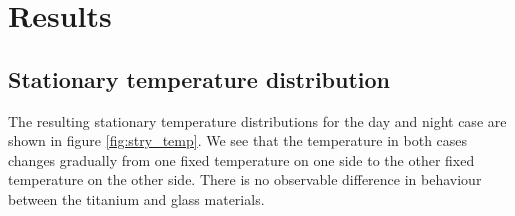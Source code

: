 \documentclass[a4paper,11pt]{article}
\begin{document}
\section{Results}

\subsection{Stationary temperature distribution}
The resulting stationary temperature distributions for the day and night case are shown in figure \ref{fig:stry_temp}. We see that the temperature in both cases changes gradually from one fixed temperature on one side to the other fixed temperature on the other side. There is no observable difference in behaviour between the titanium and glass materials. 
\end{document}
